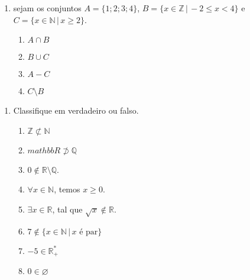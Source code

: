 \documentclass[a4paper, 12pt]{article}
\begin{document}
\begin{enumerate}
 \item sejam os conjuntos $A = \{1;2;3;4\}$,
$B = \{x \in \mathbb{Z} \,|\, -2 \leq x < 4\}$ e 
$C = \{x \in \mathbb{N} \,|\, x \geq 2\}$.
\begin{enumerate}
\item $A \cap B$
\item $B \cup C$
\item $A - C$
\item $C\setminus B$
\end{enumerate}

\end{enumerate}

\begin{enumerate}
  \item Classifique em verdadeiro ou falso.
    \begin{enumerate}
      \item $\mathbb{Z} \not\subset \mathbb{N}$
      \item $mathbb{R} \not\supset \mathbb{Q}$
      \item $0 \not\in \mathbb{R}\setminus\mathbb{Q}$.
      \item $\forall x \in \mathbb{N}$, temos $x \geq 0$.
      \item $\exists x \in \mathbb{R}$, tal que $\sqrt{x}\not\in\mathbb{R}$.
      \item $7 \not\in \{x\in \mathbb{N} \, |\, x \textrm{ é par}\}$
      \item $-5 \in \mathbb{R}^*_+$
      \item $0 \in \varnothing$
    \end{enumerate}
  \end{enumerate}
\end{document}
